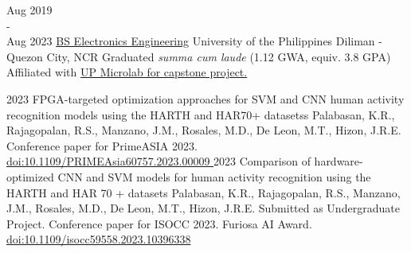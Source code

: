 \documentclass[9pt]{developercv}
\begin{document}
\begin{minipage}[t]{0.475\textwidth}
	\begin{entrylist}
		\entry
			{Aug 2019 \\ - \\ Aug 2023}
			{\href{https://www.eee.upd.edu.ph/undergraduate-programs/bs-electronics-and-communications-engineering}{BS Electronics Engineering}}
			{University of the Philippines Diliman - Quezon City, NCR}
			{Graduated \emph{summa cum laude} (1.12 GWA, equiv. 3.8 GPA)\\
			Affiliated with \href{https://www.up-microlab.org/}{UP Microlab for capstone project.}}
	\end{entrylist}
	\begin{entrylist}
		\entry
			{2023}
			{FPGA-targeted optimization approaches for SVM and CNN human activity recognition models using the HARTH and HAR70+ datasetss}
			{Palabasan, K.R., Rajagopalan, R.S., Manzano, J.M., Rosales, M.D., De Leon, M.T., Hizon, J.R.E.}
			{Conference paper for PrimeASIA 2023. \\
			\href{https://dx.doi.org/10.1109/PRIMEAsia60757.2023.00009}{doi:10.1109/PRIMEAsia60757.2023.00009 }}
		\entry
			{2023}
			{Comparison of hardware-optimized CNN and SVM models for human activity recognition using the HARTH and HAR 70 + datasets}
			{Palabasan, K.R., Rajagopalan, R.S., Manzano, J.M., Rosales, M.D., De Leon, M.T., Hizon, J.R.E.}
			{Submitted as Undergraduate Project. Conference paper for ISOCC 2023. Furiosa AI Award. \\ \href{https://dx.doi.org/10.1109/isocc59558.2023.10396338}{doi:10.1109/isocc59558.2023.10396338 }}
	\end{entrylist}
\end{minipage}
\end{document}
